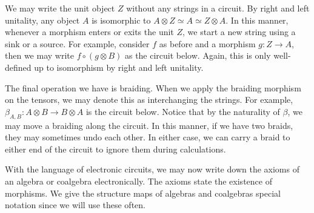 \documentclass[../thesis.tex]{subfiles}
\begin{document}
            We may write the unit object $Z$ without any strings in a circuit. By right and left unitality, any object $A$ is isomorphic to $A \otimes Z \simeq A \simeq Z \otimes A$. In this manner, whenever a morphism enters or exits the unit $Z$, we start a new string using a sink or a source. For example, consider $f$ as before and a morphism $g: Z \rightarrow A$, then we may write $f \circ (g \otimes B)$ as the circuit below. Again, this is only well-defined up to isomorphism by right and left unitality.
            \begin{center}
            \end{center}

            The final operation we have is braiding. When we apply the braiding morphism on the tensors, we may denote this as interchanging the strings. For example, $\beta_{A, B}: A \otimes B \rightarrow B \otimes A$ is the circuit below. Notice that by the naturality of $\beta$, we may move a braiding along the circuit. In this manner, if we have two braids, they may sometimes undo each other. In either case, we can carry a braid to either end of the circuit to ignore them during calculations.
            \begin{center}
            \end{center}

            With the language of electronic circuits, we may now write down the axioms of an algebra or coalgebra electronically. The axioms state the existence of morphisms. We give the structure maps of algebras and coalgebras special notation since we will use these often.
\end{document}
